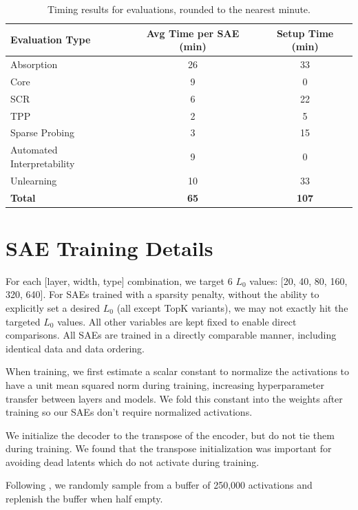 \documentclass{article}
\theoremstyle{plain}
\theoremstyle{definition}
\theoremstyle{remark}
\begin{document}
\begin{table}[h]
\centering
\begin{tabular}{|l|c|c|}
\hline
Evaluation Type & Avg Time per SAE (min) & Setup Time (min) \\ \hline
Absorption & 26 & 33 \\ \hline
Core & 9 & 0 \\ \hline
SCR & 6 & 22 \\ \hline
TPP & 2 & 5 \\ \hline
Sparse Probing & 3 & 15 \\ \hline
Automated Interpretability & 9 & 0 \\ \hline
Unlearning & 10 & 33 \\ \hline
\textbf{Total} & \textbf{65} & \textbf{107} \\ \hline

\end{tabular}
\caption{Timing results for evaluations, rounded to the nearest minute.}
\label{tab:eval_timing}
\end{table}


\section{SAE Training Details}
\label{app:sae-training-details}

For each [layer, width, type] combination, we target 6 $L_0$ values: [20, 40, 80, 160, 320, 640]. For SAEs trained with a sparsity penalty, without the ability to explicitly set a desired $L_0$ (all except TopK variants), we may not exactly hit the targeted $L_0$ values. All other variables are kept fixed to enable direct comparisons. All SAEs are trained in a directly comparable manner, including identical data and data ordering.

When training, we first estimate a scalar constant to normalize the activations to have a unit mean squared norm during training, increasing hyperparameter transfer between layers and models. We fold this constant into the weights after training so our SAEs don't require normalized activations.

We initialize the decoder to the transpose of the encoder, but do not tie them during training. We found that the transpose initialization was important for avoiding dead latents which do not activate during training.

Following \cite{neel_sae_replication}, we randomly sample from a buffer of 250,000 activations and replenish the buffer when half empty.
\end{document}
